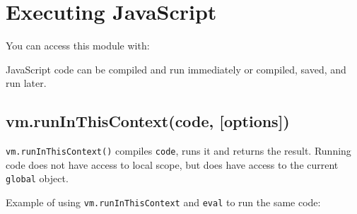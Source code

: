 \section{Executing JavaScript}\label{executing-javascript}

\begin{Shaded}
\begin{Highlighting}[]
 
\end{Highlighting}
\end{Shaded}

You can access this module with:

\begin{Shaded}
\begin{Highlighting}[]
 \NormalTok{(}\NormalTok{);}
\end{Highlighting}
\end{Shaded}

JavaScript code can be compiled and run immediately or compiled, saved,
and run later.

\subsection{vm.runInThisContext(code,
{[}options{]})}\label{vm.runinthiscontextcode-options}

\texttt{vm.runInThisContext()} compiles \texttt{code}, runs it and
returns the result. Running code does not have access to local scope,
but does have access to the current \texttt{global} object.

Example of using \texttt{vm.runInThisContext} and \texttt{eval} to run
the same code:

\begin{Shaded}
\begin{Highlighting}[]
 \NormalTok{;}

 \NormalTok{(}\NormalTok{);}
\NormalTok{(}
\NormalTok{(}

 \NormalTok{(}\NormalTok{);}
\NormalTok{(}
\NormalTok{(}

\end{Highlighting}
\end{Shaded}

